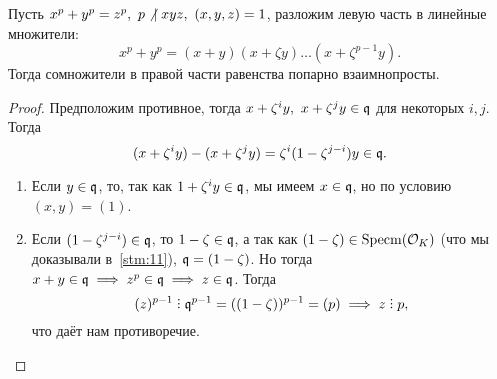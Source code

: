  	\begin{lemma}\label{lemma:15}
 		Пусть $x^p + y^p = z^p, \ p \not \ \mid xyz, \ (x, y, z) = 1$, разложим левую часть в линейные множители:
 	\[
 		x^p + y^p = (x + y)(x + \zeta y)\ldots(x + \zeta^{p - 1}y). 
 	\]
 	Тогда сомножители в правой части равенства попарно взаимнопросты. 
 	\end{lemma}
 	\begin{proof}
 		Предположим противное, тогда $x + \zeta^i y, \ x + \zeta^{j} y \in \mathfrak{q}$ для некоторых $i, j$. Тогда 
 		\[
 			(x + \zeta^i y) - (x + \zeta^{j} y) = \zeta^i(1 - \zeta^{j - i})y \in \mathfrak{q}.
 		\]
 		\begin{enumerate}
 			\item Если $y \in \mathfrak{q}$, то, так как $1 + \zeta^i y \in \mathfrak{q}$, мы имеем $x \in \mathfrak{q}$, но по условию $(x, y) = (1)$.

 			\item Если $(1 - \zeta^{j - i}) \in \mathfrak{q} $, то $1 - \zeta \in \mathfrak{q}$, а так как $(1 - \zeta) \in \operatorname{Specm}(\mathcal{O}_{K})$ (что мы доказывали в~\ref{stm:11}), $\mathfrak{q} = (1 - \zeta)$. Но тогда $x + y \in \mathfrak{q} \implies z^p \in \mathfrak{q} \implies z \in \mathfrak{q}$. Тогда 
 			\[
 				(z)^{p - 1} \divby \fq^{p - 1} = ((1 - \zeta))^{p - 1} = (p) \implies z \divby p,
 			\]
 			что даёт нам противоречие. 
 		\end{enumerate}
 	\end{proof}

